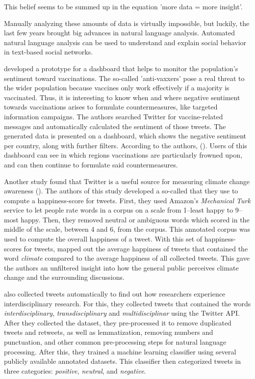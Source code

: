 This belief seems to be summed up in the equation 'more data = more insight'.

Manually analyzing these amounts of data is virtually impossible, but luckily, the last few years brought big advances in natural language analysis. Automated natural language analysis can be used to understand and explain social behavior in text-based social networks.

\citeauthor{bahk2016publicly} developed a prototype for a dashboard that helps to monitor the population's sentiment toward vaccinations. The so-called 'anti-vaxxers' pose a real threat to the wider population because vaccines only work effectively if a majority is vaccinated. Thus, it is interesting to know when and where negative sentiment towards vaccinations arises to formulate countermeasures, like targeted information campaigns. The authors searched Twitter for vaccine-related messages and automatically calculated the sentiment of those tweets. The generated data is presented on a dashboard, which shows the negative sentiment per country, along with further filters. According to the authors,  (\cite[343]{bahk2016publicly}). Users of this dashboard can see in which regions vaccinations are particularly frowned upon, and can then continue to formulate said countermeasures.

Another study found that Twitter is a useful source for measuring climate change awareness (\cite{codyClimateChangeSentiment2015}). The authors of this study developed a so-called  that they use to compute a happiness-score for tweets. First, they used Amazon's \emph{Mechanical Turk} service to let people rate words in a corpus on a scale from 1--least happy to 9--most happy. Then, they removed neutral or ambiguous words which scored in the middle of the scale, between 4 and 6, from the corpus. This annotated corpus was used to compute the overall happiness of a tweet. With this set of happiness-scores for tweets, \citeauthor{codyClimateChangeSentiment2015} mapped out the average happiness of tweets that contained the word \emph{climate} compared to the average happiness of all collected tweets. This gave the authors an unfiltered insight into how the general public perceives climate change and the surrounding discussions.

\citeauthor{weberInterdisciplinaryOptimismSentiment2019} also collected tweets automatically to find out how researchers experience interdisciplinary research. For this, they collected tweets that contained the words \emph{interdisciplinary}, \emph{transdisciplinary} and \emph{multidisciplinar} using the Twitter API. After they collected the dataset, they pre-processed it to remove duplicated tweets and retweets, as well as lemmatization, removing numbers and punctuation, and other common pre-processing steps for natural language processing. After this, they trained a machine learning classifier using several publicly available annotated datasets. This classifier then categorized tweets in three categories: \emph{positive}, \emph{neutral}, and \emph{negative}.

